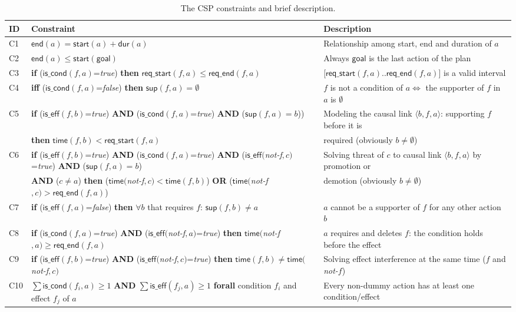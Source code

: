 \documentclass{ecai}
\newcommand{\tup}[1]{{\langle #1 \rangle}}
\newcommand{\dur}{\mathsf{dur}}    %
\newcommand{\iscond}{\mathsf{is\_cond}}    %
\newcommand{\iseff}{\mathsf{is\_eff}}    %
\newcommand{\start}{\mathsf{start}}%
\newcommand{\en}{\mathsf{end}}     %
\newcommand{\supp}{\mathsf{sup}}   %
\newcommand{\tim}{\mathsf{time}}   %
\newcommand{\reqs}{\mathsf{req\_{start}}} %
\newcommand{\reqe}{\mathsf{req\_{end}}}   %
\newcommand{\goal}{\mathsf{goal}}  %
\begin{document}
\begin{table*}
\begin{center}
\caption{The CSP constraints and brief description.}	
\begin{scriptsize}
\begin{tabular}{lp{10.4cm}p{6.6cm}}
\hline
{\bf ID}&{\bf Constraint}&{\bf Description}\\\hline
C1& $\en(a)=\start(a)+\dur(a)$ & Relationship among start, end and duration of $a$ \\
C2& $\en(a) \leq \start(\goal)$ & Always $\goal$ is the last action of the plan \\
C3& \textbf{if} ($\iscond(f,a)$=\textit{true}) \textbf{then} $\reqs(f,a) \leq \reqe(f,a)$ & [$\reqs(f,a)..\reqe(f,a)$] is a valid interval\\
C4& \textbf{iff} ($\iscond(f,a)$=\textit{false}) \textbf{then} $\supp(f,a) = \emptyset$ & $f$ is not a condition of $a \iff $ the supporter of $f$ in $a$ is $\emptyset$ \\
C5& \textbf{if} ($\iseff(f,b)$=\textit{true}) \textbf{AND} ($\iscond(f,a)$=\textit{true}) \textbf{AND} ($\supp(f,a)=b$))  & Modeling the causal link $\tup{b,f,a}$: supporting $f$ before it is \\
&\hspace{0.5cm}\textbf{then} $\tim(f,b) < \reqs(f,a)$ & required (obviously $b \neq \emptyset$) \\
C6& \textbf{if} ($\iseff(f,b)$=\textit{true}) \textbf{AND} ($\iscond(f,a)$=\textit{true}) \textbf{AND} ($\iseff($\textit{not-f}$,c)$=\textit{true}) \textbf{AND} ($\supp(f,a)=b$) & Solving threat of $c$ to causal link $\tup{b,f,a}$ by promotion or \\
&\hspace{0.5cm}\textbf{AND} ($c \neq a$) \textbf{then} ($\tim($\textit{not-f}$,c) < \tim(f,b)$) \textbf{OR} ($\tim($\textit{not-f}$,c) > \reqe(f,a)$) & demotion (obviously $b \neq \emptyset$) \\
C7& \textbf{if} ($\iseff(f,a)$=\textit{false}) \textbf{then} $\forall b$ that requires $f$: $\supp(f,b) \neq a$ & $a$ cannot be a supporter of $f$ for any other action $b$\\
C8& \textbf{if} ($\iscond(f,a)$=\textit{true}) \textbf{AND} ($\iseff($\textit{not-f}$,a)$=\textit{true}) \textbf{then} $\tim($\textit{not-f}$,a) \geq \reqe(f,a)$ & $a$ requires and deletes $f$: the condition holds before the effect \\ 
C9& \textbf{if} ($\iseff(f,b)$=\textit{true}) \textbf{AND} ($\iseff($\textit{not-f}$,c)$=\textit{true}) \textbf{then} $\tim(f,b) \neq \tim($\textit{not-f}$,c)$ & Solving effect interference at the same time ($f$ and \textit{not-}$f$) \\
C10& $\sum \iscond(f_i,a) \geq 1$ \textbf{AND} $\sum \iseff(f_j,a) \geq 1$ \textbf{forall} condition $f_i$ and effect $f_j$ of $a$ & Every non-dummy action has at least one condition/effect
\end{tabular}
\end{scriptsize}	
\label{table:constraints}
\end{center}	
\end{table*}
\end{document}
